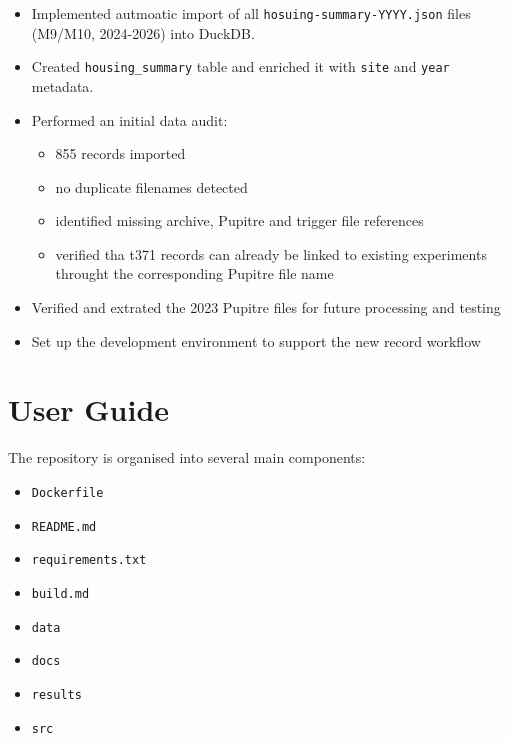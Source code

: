 \documentclass[english,10pt,a4paper]{article}
\begin{document}
\begin{itemize}
    \item Implemented autmoatic import of all 
          \texttt{hosuing-summary-YYYY.json} files (M9/M10, 2024-2026) into 
          DuckDB.
    \item Created \texttt{housing_summary} table and enriched it with \texttt{site} 
          and \texttt{year} metadata.
    \item Performed an initial data audit:
        \begin{itemize}
            \item 855 records imported
            \item no duplicate filenames detected
            \item identified missing archive, Pupitre and trigger file references
            \item verified tha t371 records can already be linked to existing
                  experiments throught the corresponding Pupitre file name
        \end{itemize}
    \item Verified and extrated the 2023 Pupitre files for future processing 
          and testing
    \item Set up the development environment to support the new record workflow
\end{itemize}


\pagebreak





\appendix

\section{User Guide}

The repository is organised into several main components:
\begin{itemize}
    \item \texttt{Dockerfile}
    \item \texttt{README.md}
    \item \texttt{requirements.txt}
    \item \texttt{build.md}
    \item \texttt{data}
    \item \texttt{docs}
    \item \texttt{results}
    \item \texttt{src}
\end{itemize}
\end{document}
